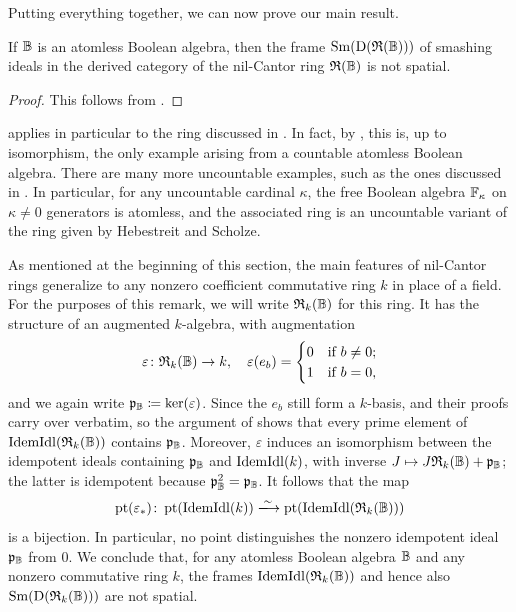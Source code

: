 \documentclass{amsart}
\begin{document}
    Putting everything together, we can now prove our main result. 
    \begin{Thm}\label{thm:main-theorem}
        If $\mathbb{B}$ is an atomless Boolean algebra, then the frame $\operatorname{Sm}(\operatorname{D}(\mathfrak{R}(\mathbb{B})))$ of smashing ideals in the derived category of the nil-Cantor ring $\mathfrak{R}(\mathbb{B})$ is not spatial. 
    \end{Thm}
    \begin{proof}
        This follows from . 
    \end{proof}
    \begin{Exa}\label{exa:large}
         applies in particular to the ring discussed in . In fact, by , this is, up to isomorphism, the only example arising from a countable atomless Boolean algebra. There are many more uncountable examples, such as the ones discussed in . In particular, for any uncountable cardinal $\kappa$, the free Boolean algebra $\mathbb{F}_\kappa$ on $\kappa \neq 0$ generators is atomless, and the associated ring is an uncountable variant of the ring given by Hebestreit and Scholze. 
    \end{Exa}
    

    \begin{Rem}\label{rem:moregeneralcoefficients}
    As mentioned at the beginning of this section, the main features of nil-Cantor rings generalize to any nonzero coefficient commutative ring $k$ in place of a field. For the purposes of this remark, we will write $\mathfrak{R}_k(\mathbb{B})$ for this ring. It has the structure of an augmented $k$-algebra, with augmentation
        \[
            \varepsilon\colon \mathfrak{R}_k(\mathbb{B}) \to k, \quad 
                \varepsilon(e_b) = 
                    \begin{cases}
                        0 & \text{if } b \neq 0; \\
                        1 & \text{if } b=0,
                    \end{cases}
        \]
    and we again write $\mathfrak{p}_{\mathbb{B}} \coloneqq \ker(\varepsilon)$. Since the $e_b$ still form a $k$-basis,  and their proofs carry over verbatim, so the argument of  shows that every prime element of $\mathrm{IdemIdl}(\mathfrak{R}_k(\mathbb{B}))$ contains $\mathfrak{p}_{\mathbb{B}}$. Moreover, $\varepsilon$ induces an isomorphism between the idempotent ideals containing $\mathfrak{p}_{\mathbb{B}}$ and $\mathrm{IdemIdl}(k)$, with inverse $J \mapsto J\mathfrak{R}_k(\mathbb{B}) + \mathfrak{p}_{\mathbb{B}}$; the latter is idempotent because $\mathfrak{p}_{\mathbb{B}}^2 = \mathfrak{p}_{\mathbb{B}}$. It follows that the map
        \[
            \pt(\varepsilon_*)\colon \pt(\Idem{k})  \xlongrightarrow{\sim} \pt(\Idem{\mathfrak{R}_k(\ba{B})})
        \]
    is a bijection. In particular, no point distinguishes the nonzero idempotent ideal $\mathfrak{p}_{\mathbb{B}}$ from $0$. We conclude that, for any atomless Boolean algebra $\mathbb{B}$ and any nonzero commutative ring $k$, the frames $\mathrm{IdemIdl}(\mathfrak{R}_k(\mathbb{B}))$ and hence also $\operatorname{Sm}(\operatorname{D}(\mathfrak{R}_k(\mathbb{B})))$ are not spatial.
\end{Rem}
    
\end{document}
